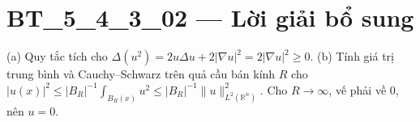 \documentclass[10pt,a4paper]{article}
\begin{document}
\section*{BT\_5\_4\_3\_02 — Lời giải bổ sung}
(a) Quy tắc tích cho $\Delta(u^2)=2u\Delta u+2|\nabla u|^2=2|\nabla u|^2\ge0$.
(b) Tính giá trị trung bình và Cauchy--Schwarz trên quả cầu bán kính $R$ cho $|u(x)|^2\le |B_R|^{-1}\int_{B_R(x)}u^2\le |B_R|^{-1}\|u\|_{L^2(\mathbb R^n)}^2$. Cho $R\to\infty$, vế phải về 0, nên $u=0$.
\end{document}
